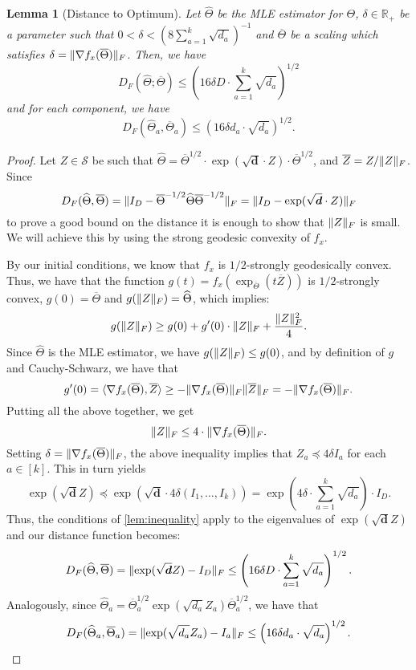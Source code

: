 \documentclass[aos]{imsart}
\newtheorem{lemma}[theorem]{Lemma}
\theoremstyle{definition}
\numberwithin{equation}{section}
\DeclarePairedDelimiter{\norm}{\lVert}{\rVert}
\newcommand{\R}{{\mathbb{R}}}
\newcommand{\otheta}{\overline{\Theta}}
\newcommand{\htheta}{\widehat{\Theta}}
\newcommand{\oZ}{\overline{Z}}
\renewcommand{\vec}{\bm}
\newcommand{\Sym}{\mathcal{S}}
\begin{document}
\begin{lemma}[Distance to Optimum]\label{lem:tensor-distance-opt}
	Let $\htheta$ be the MLE estimator for $\Theta$, $\delta \in \R_+$ be a parameter such that
	$0 < \delta < \left(8 \sum_{a=1}^k \sqrt{d_a} \right)^{-1}$ and $\otheta$ be a scaling which satisfies $\delta = \norm{\nabla f_x(\otheta)}_F$. Then, we have
	$$ D_F(\htheta; \otheta) \leq \left( 16 \delta D \cdot \sum_{a=1}^k \sqrt{d_a} \right)^{1/2} $$
	and for each component, we have
	$$ D_F(\htheta_a, \otheta_a) \leq \left( 16 \delta d_a \cdot \sqrt{d_a} \right)^{1/2}. $$
\end{lemma}

\begin{proof}
	Let $Z \in \Sym$ be such that $\htheta = \otheta^{1/2} \cdot \exp(\sqrt{\vec d} \cdot Z) \cdot \otheta^{1/2}$, and $\oZ = Z / \norm{Z}_F$.
	Since
	$$ D_F(\htheta, \otheta) = \norm{I_D - \otheta^{-1/2} \htheta \otheta^{-1/2}}_F = \norm{I_D - \exp(\sqrt{\vec d} \cdot Z)}_F $$
	to prove a good bound on the distance it is enough to show that $\norm{Z}_F$ is small.
	We will achieve this by using the strong geodesic convexity of $f_x$.

	By our initial conditions, we know that $f_x$ is $1/2$-strongly geodesically convex.
	Thus, we have that the function $g(t) = f_x(\exp_{\otheta} (t \oZ) )$ is $1/2$-strongly convex, $g(0) = \otheta$ and $g(\norm{Z}_F) = \htheta$, which implies:
	$$ g(\norm{Z}_F) \geq g(0) + g'(0) \cdot \norm{Z}_F + \frac{\norm{Z}_F^2}{4}. $$
	Since $\htheta$ is the MLE estimator, we have $g(\norm{Z}_F) \leq g(0)$, and by definition of
	$g$ and Cauchy-Schwarz, we have that
	$$ g'(0) = \langle \nabla f_x(\otheta), \oZ \rangle \geq - \norm{\nabla f_x(\otheta)}_F \norm{\oZ}_F = - \norm{\nabla f_x(\otheta)}_F. $$
	Putting all the above together, we get
	$$ \norm{Z}_F \leq 4 \cdot \norm{\nabla f_x(\otheta)}_F. $$
	Setting $\delta = \norm{\nabla f_x(\otheta)}_F$, the above inequality implies that $Z_a \preceq 4 \delta I_a$ for each $a \in [k]$. This in turn yields
	$$ \exp(\sqrt{\vec d} Z) \preceq \exp(\sqrt{\vec d} \cdot 4\delta (I_1, \dots, I_k)) =
	\exp\left(4 \delta \cdot \sum_{a=1}^k \sqrt{d_a} \right) \cdot I_D. $$
	Thus, the conditions of \cref{lem:inequality} apply to the eigenvalues of $\exp(\sqrt{\vec d} Z)$ and our distance function becomes:
	$$ D_F(\htheta, \otheta) =  \norm{\exp(\sqrt{\vec d} Z) - I_D}_F \leq \left( 16 \delta D \cdot \sum_{a=1}^k \sqrt{d_a} \right)^{1/2}. $$
	Analogously, since $\htheta_a = \otheta^{1/2}_a \exp(\sqrt{d_a} Z_a) \otheta^{1/2}_a$, we have that
	$$ D_F(\htheta_a, \otheta_a) =  \norm{\exp(\sqrt{d_a} Z_a) - I_a}_F \leq \left( 16 \delta d_a \cdot \sqrt{d_a} \right)^{1/2}. $$
\end{proof}
\end{document}
